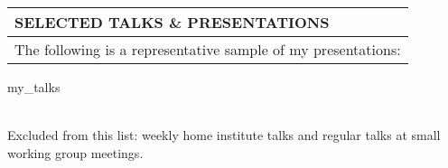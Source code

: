 \begin{longtable}{p{}}
{\bf SELECTED TALKS \& PRESENTATIONS}\\
\toprule
The following is a representative sample of my presentations:
\end{longtable}
\vspace{-5.5\baselineskip}
{my_talks}{} %
\vspace{\longtabletopsepspecial}
\begin{flushleft}
~\\
{Excluded from this list: weekly home institute talks and regular talks at small working group meetings.}\\ 
\end{flushleft}
